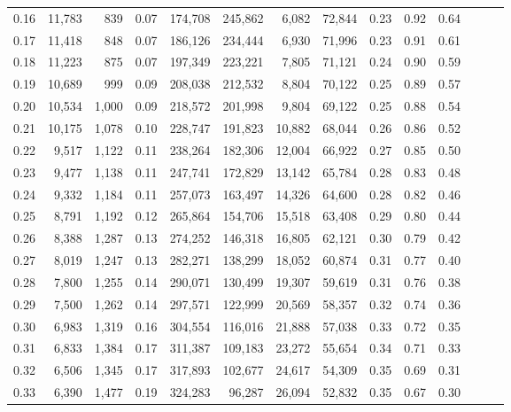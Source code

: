 \begin{tabular}{rrrrrrrrrrrrrr}
0.16 &  11,783 &    839 &  0.07 &  174,708 &  245,862 &   6,082 &  72,844 &  0.23 &  0.92 &      0.64 \\
0.17 &  11,418 &    848 &  0.07 &  186,126 &  234,444 &   6,930 &  71,996 &  0.23 &  0.91 &      0.61 \\
0.18 &  11,223 &    875 &  0.07 &  197,349 &  223,221 &   7,805 &  71,121 &  0.24 &  0.90 &      0.59 \\
0.19 &  10,689 &    999 &  0.09 &  208,038 &  212,532 &   8,804 &  70,122 &  0.25 &  0.89 &      0.57 \\
0.20 &  10,534 &  1,000 &  0.09 &  218,572 &  201,998 &   9,804 &  69,122 &  0.25 &  0.88 &      0.54 \\
0.21 &  10,175 &  1,078 &  0.10 &  228,747 &  191,823 &  10,882 &  68,044 &  0.26 &  0.86 &      0.52 \\
0.22 &   9,517 &  1,122 &  0.11 &  238,264 &  182,306 &  12,004 &  66,922 &  0.27 &  0.85 &      0.50 \\
0.23 &   9,477 &  1,138 &  0.11 &  247,741 &  172,829 &  13,142 &  65,784 &  0.28 &  0.83 &      0.48 \\
0.24 &   9,332 &  1,184 &  0.11 &  257,073 &  163,497 &  14,326 &  64,600 &  0.28 &  0.82 &      0.46 \\
0.25 &   8,791 &  1,192 &  0.12 &  265,864 &  154,706 &  15,518 &  63,408 &  0.29 &  0.80 &      0.44 \\
0.26 &   8,388 &  1,287 &  0.13 &  274,252 &  146,318 &  16,805 &  62,121 &  0.30 &  0.79 &      0.42 \\
0.27 &   8,019 &  1,247 &  0.13 &  282,271 &  138,299 &  18,052 &  60,874 &  0.31 &  0.77 &      0.40 \\
0.28 &   7,800 &  1,255 &  0.14 &  290,071 &  130,499 &  19,307 &  59,619 &  0.31 &  0.76 &      0.38 \\
0.29 &   7,500 &  1,262 &  0.14 &  297,571 &  122,999 &  20,569 &  58,357 &  0.32 &  0.74 &      0.36 \\
0.30 &   6,983 &  1,319 &  0.16 &  304,554 &  116,016 &  21,888 &  57,038 &  0.33 &  0.72 &      0.35 \\
0.31 &   6,833 &  1,384 &  0.17 &  311,387 &  109,183 &  23,272 &  55,654 &  0.34 &  0.71 &      0.33 \\
0.32 &   6,506 &  1,345 &  0.17 &  317,893 &  102,677 &  24,617 &  54,309 &  0.35 &  0.69 &      0.31 \\
0.33 &   6,390 &  1,477 &  0.19 &  324,283 &   96,287 &  26,094 &  52,832 &  0.35 &  0.67 &      0.30 \\

\end{tabular}
